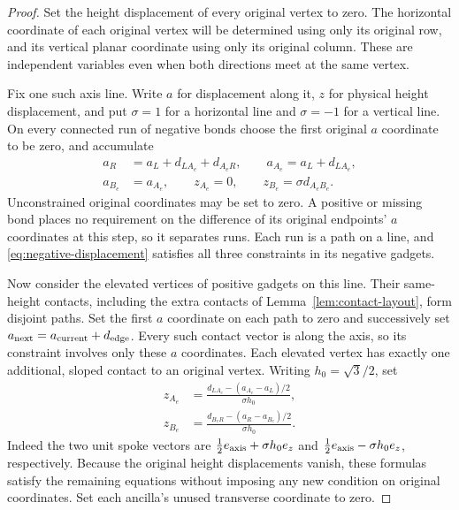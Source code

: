 \begin{proof}
Set the height displacement of every original vertex to zero.
The horizontal coordinate of each original vertex will be determined
using only its original row, and its vertical planar coordinate using
only its original column.  These are independent variables even when
both directions meet at the same vertex.

Fix one such axis line.  Write $a$ for displacement along it, $z$
for physical height displacement, and put $\sigma=1$ for a horizontal
line and $\sigma=-1$ for a vertical line.  On every connected run of
negative bonds choose the first original $a$ coordinate to be zero,
and accumulate
\begin{equation}\label{eq:negative-displacement}
 \begin{split}
 a_R&=a_L+d_{LA_e}+d_{A_eR},\qquad
 a_{A_e}=a_L+d_{LA_e},\\
 a_{B_e}&=a_{A_e},\qquad
 z_{A_e}=0,\qquad z_{B_e}=\sigma d_{A_eB_e}.
 \end{split}
\end{equation}
Unconstrained original coordinates may be set to zero.  A positive
or missing bond places no requirement on the difference of its
original endpoints' $a$ coordinates at this step, so it separates
runs.  Each run is a path on a line, and
\eqref{eq:negative-displacement} satisfies all three constraints in
its negative gadgets.

Now consider the elevated vertices of positive gadgets on this line.
Their same-height contacts, including the extra contacts of
Lemma~\ref{lem:contact-layout}, form disjoint paths.  Set the first
$a$ coordinate on each path to zero and successively set
$a_{\rm next}=a_{\rm current}+d_{\rm edge}$.
Every such contact vector is along the axis, so its constraint
involves only these $a$ coordinates.  Each elevated vertex has
exactly one additional, sloped contact to an original vertex.
Writing $h_0=\sqrt3/2$, set
\begin{equation}\label{eq:positive-displacement}
 \begin{split}
 z_{A_e}&=\frac{d_{LA_e}-(a_{A_e}-a_L)/2}{\sigma h_0},\\
 z_{B_e}&=\frac{d_{B_eR}-(a_R-a_{B_e})/2}{\sigma h_0}.
 \end{split}
\end{equation}
Indeed the two unit spoke vectors are
$\tfrac12 e_{\rm axis}+\sigma h_0 e_z$ and
$\tfrac12 e_{\rm axis}-\sigma h_0 e_z$, respectively.
Because the original height displacements vanish, these formulas
satisfy the remaining equations without imposing any new condition
on original coordinates.  Set each ancilla's unused transverse
coordinate to zero.


\end{proof}

